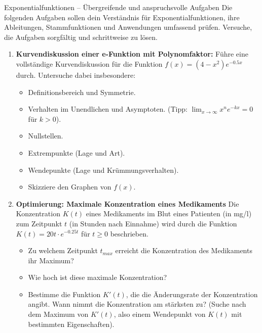 \begin{aufgabenumgebung}{Exponentialfunktionen – Übergreifende und anspruchsvolle Aufgaben}
Die folgenden Aufgaben sollen dein Verständnis für Exponentialfunktionen, ihre Ableitungen, Stammfunktionen und Anwendungen umfassend prüfen. Versuche, die Aufgaben sorgfältig und schrittweise zu lösen.
\begin{enumerate}
    \item \textbf{Kurvendiskussion einer e-Funktion mit Polynomfaktor:}
        Führe eine vollständige Kurvendiskussion für die Funktion $f(x) = (4-x^2)e^{-0.5x}$ durch. Untersuche dabei insbesondere:
        \begin{itemize}
            \item Definitionsbereich und Symmetrie.
            \item Verhalten im Unendlichen und Asymptoten. (Tipp: $\lim_{x\to\infty} x^n e^{-kx} = 0$ für $k>0$).
            \item Nullstellen.
            \item Extrempunkte (Lage und Art).
            \item Wendepunkte (Lage und Krümmungsverhalten).
            \item Skizziere den Graphen von $f(x)$.
        \end{itemize}

    \item \textbf{Optimierung: Maximale Konzentration eines Medikaments}
        Die Konzentration $K(t)$ eines Medikaments im Blut eines Patienten (in mg/l) zum Zeitpunkt $t$ (in Stunden nach Einnahme) wird durch die Funktion $K(t) = 20t \cdot e^{-0.25t}$ für $t \ge 0$ beschrieben.
        \begin{itemize}
            \item Zu welchem Zeitpunkt $t_{max}$ erreicht die Konzentration des Medikaments ihr Maximum?
            \item Wie hoch ist diese maximale Konzentration?
            \item Bestimme die Funktion $K'(t)$, die die Änderungsrate der Konzentration angibt. Wann nimmt die Konzentration am stärksten zu? (Suche nach dem Maximum von $K'(t)$, also einem Wendepunkt von $K(t)$ mit bestimmten Eigenschaften).
        \end{itemize}


\end{enumerate}
\end{aufgabenumgebung}
